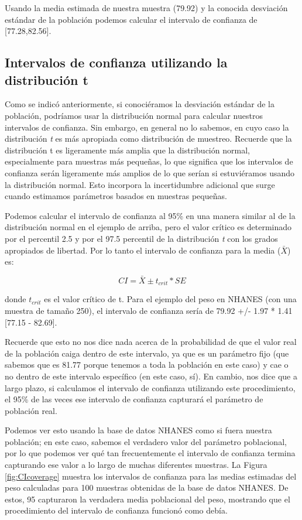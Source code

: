 \documentclass[
  12pt,
]{book}
\begin{document}
Usando la media estimada de nuestra muestra (79.92) y la conocida desviación estándar de la población podemos calcular el intervalo de confianza de {[}77.28,82.56{]}.

\hypertarget{intervalos-de-confianza-utilizando-la-distribuciuxf3n-t}{%
\subsection{Intervalos de confianza utilizando la distribución t}\label{intervalos-de-confianza-utilizando-la-distribuciuxf3n-t}}

Como se indicó anteriormente, si conociéramos la desviación estándar de la población, podríamos usar la distribución normal para calcular nuestros intervalos de confianza. Sin embargo, en general no lo sabemos, en cuyo caso la distribución \emph{t} es más apropiada como distribución de muestreo. Recuerde que la distribución t es ligeramente más amplia que la distribución normal, especialmente para muestras más pequeñas, lo que significa que los intervalos de confianza serán ligeramente más amplios de lo que serían si estuviéramos usando la distribución normal. Esto incorpora la incertidumbre adicional que surge cuando estimamos parámetros basados en muestras pequeñas.

Podemos calcular el intervalo de confianza al 95\% en una manera similar al de la distribución normal en el ejemplo de arriba, pero el valor crítico es determinado por el percentil 2.5 y por el 97.5 percentil de la distribución \emph{t} con los grados apropiados de libertad. Por lo tanto el intervalo de confianza para la media (\(\bar{X}\)) es:

\[
CI = \bar{X} \pm t_{crit}*SE
\]

donde \(t_{crit}\) es el valor crítico de t.
Para el ejemplo del peso en NHANES (con una muestra de tamaño 250), el intervalo de confianza sería de 79.92 +/- 1.97 * 1.41 {[}77.15 - 82.69{]}.

Recuerde que esto no nos dice nada acerca de la probabilidad de que el valor real de la población caiga dentro de este intervalo, ya que es un parámetro fijo (que sabemos que es 81.77 porque tenemos a toda la población en este caso) y cae o no dentro de este intervalo específico (en este caso, sí). En cambio, nos dice que a largo plazo, si calculamos el intervalo de confianza utilizando este procedimiento, el 95\% de las veces ese intervalo de confianza capturará el parámetro de población real.

Podemos ver esto usando la base de datos NHANES como si fuera nuestra población; en este caso, sabemos el verdadero valor del parámetro poblacional, por lo que podemos ver qué tan frecuentemente el intervalo de confianza termina capturando ese valor a lo largo de muchas diferentes muestras. La Figura \ref{fig:CIcoverage} muestra los intervalos de confianza para las medias estimadas del peso calculadas para 100 muestras obtenidas de la base de datos NHANES. De estos, 95 capturaron la verdadera media poblacional del peso, mostrando que el procedimiento del intervalo de confianza funcionó como debía.
\end{document}

